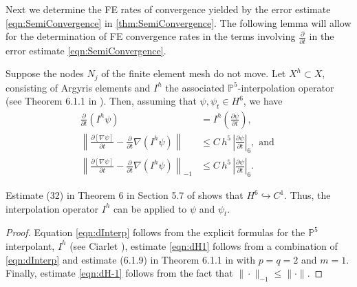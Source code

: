 Next we determine the FE rates of convergence yielded by the error estimate
\eqref{eqn:SemiConvergence} in \autoref{thm:SemiConvergence}. The following
lemma will allow for the determination of FE convergence rates in the terms
involving $\frac{\partial}{\partial t}$ in the error estimate
\eqref{eqn:SemiConvergence}.
\begin{lemma} \label{lma:Interpolation}
  Suppose the nodes $N_j$ of the finite element mesh do not move. Let
  $X^h\subset X$, consisting of Argyris elements and $I^h$ the
  associated $\mathbb{P}^5$-interpolation operator (see Theorem 6.1.1 in
  \cite{Ciarlet}). Then, assuming that $\psi, \psi_t \in H^6$, we have
  \begin{align}
    \frac{\partial}{\partial t}\left( I^h \psi \right) &=
      I^h \left( \frac{\partial \psi}{\partial t}\right), \label{eqn:dInterp} \\
    \left\|\frac{\partial \left[\nabla \psi\right]}{\partial t}
      - \frac{\partial}{\partial t} \nabla \left(I^h \psi\right)\right\|
      &\le C\, h^5\, \left|\frac{\partial \psi}{\partial t}\right|_6,
      \text{ and } \label{eqn:dH1} \\
    \left\|\frac{\partial \left[\nabla \psi\right]}{\partial t}
      - \frac{\partial}{\partial t} \nabla \left(I^h \psi\right)\right\|_{-1}
      &\le C\, h^5\, \left|\frac{\partial \psi}{\partial t}\right|_6. \label{eqn:dH-1}
  \end{align}
  \begin{remark} \label{rmk:H6imbedC1}
    Estimate (32) in Theorem 6 in Section 5.7 of \cite{Evans1989}
    shows that $H^6 \hookrightarrow C^1$. Thus, the interpolation operator $I^h$
    can be applied to $\psi$ and $\psi_t$.
  \end{remark}
\end{lemma}
\begin{proof}
  Equation \eqref{eqn:dInterp} follows from the explicit formulas for the
  $\mathbb{P}^5$ interpolant, $I^h$ (see Ciarlet \cite{Ciarlet}), estimate
  \eqref{eqn:dH1} follows from a combination of \eqref{eqn:dInterp} and
  estimate (6.1.9) in Theorem 6.1.1 in \cite{Ciarlet} with $p=q=2$ and $m=1$.
  Finally, estimate \eqref{eqn:dH-1} follows from the fact that $\|\cdot\|_{-1}
  \le \|\cdot\|$.
\end{proof}

